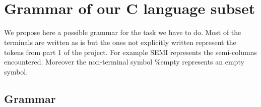 \documentclass{article}
\begin{document}





\appendix
\section{\\Grammar of our C language subset}
\label{grammar}
We propose here a possible grammar for the task we have to do. Most of the terminals are written as is but the ones not explicitly written represent the tokens from part 1 of the project. For example {\sc SEMI} represents the semi-columns encountered. Moreover the non-terminal symbol {\%empty} represents an empty symbol. 
\subsection*{Grammar}
\end{document}
